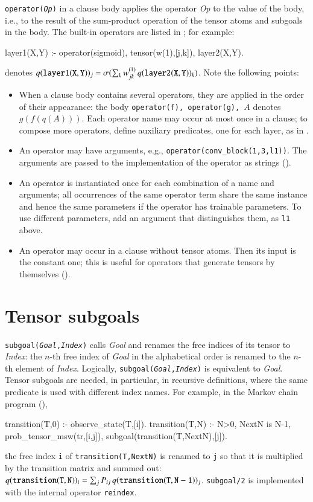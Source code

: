 \documentclass[a4paper]{report}
\begin{document}
{\tt operator({\it Op})} in a clause body applies the operator {\it Op}
to the value of the body, i.e., to the result of the sum-product
operation of the tensor atoms and subgoals in the body.  The built-in
operators are listed in ; for example:
\begin{prologcode}
layer1(X,Y) :- operator(sigmoid), tensor(w(1),[j,k]), layer2(X,Y).
\end{prologcode}
denotes $q({\tt layer1(X,Y)})_j=\sigma(\sum_k w^{(1)}_{jk}\, q({\tt layer2(X,Y)})_k)$.
Note the following points:
\begin{itemize}
	\item When a clause body contains several operators, they are applied
	in the order of their appearance: the body {\tt operator(f), operator(g),
		$A$} denotes $g(f(q(A)))$.  Each operator name may occur at most once in
	a clause; to compose more operators, define auxiliary predicates, one
	for each layer, as in .
	\item An operator may have arguments, e.g., {\tt operator(conv\_block(1,3,l1))}.
	The arguments are passed to the implementation of the operator as
	strings ().
	\item An operator is instantiated once for each combination of a name
	and arguments; all occurrences of the same operator term share the same
	instance and hence the same parameters if the operator has trainable
	parameters.  To use different parameters, add an argument that
	distinguishes them, as {\tt l1} above.
	\item An operator may occur in a clause without tensor atoms.  Then its
	input is the constant one; this is useful for operators that generate
	tensors by themselves ().
\end{itemize}

\section{Tensor subgoals}
\label{sec:subgoal}

{\tt subgoal({\it Goal},{\it Index})} calls {\it Goal} and renames the
free indices of its tensor to {\it Index}: the $n$-th free index of {\it
	Goal} in the alphabetical order is renamed to the $n$-th element of {\it
	Index}.  Logically, {\tt subgoal({\it Goal},{\it Index})} is equivalent to
{\it Goal}.  Tensor subgoals are needed, in particular, in recursive
definitions, where the same predicate is used with different index
names.  For example, in the Markov chain program
(),
\begin{prologcode}
transition(T,0) :- observe_state(T,[i]).
transition(T,N) :-
    N>0, NextN is N-1,
    prob_tensor_msw(tr,[i,j]),
    subgoal(transition(T,NextN),[j]).
\end{prologcode}
the free index {\tt i} of {\tt transition(T,NextN)} is renamed to {\tt j}
so that it is multiplied by the transition matrix and summed out:
$q({\tt transition(T,N)})_i=\sum_j P_{ij}\,q({\tt transition(T,N-1)})_j$.
{\tt subgoal/2} is implemented with the internal operator {\tt reindex}.
\end{document}
